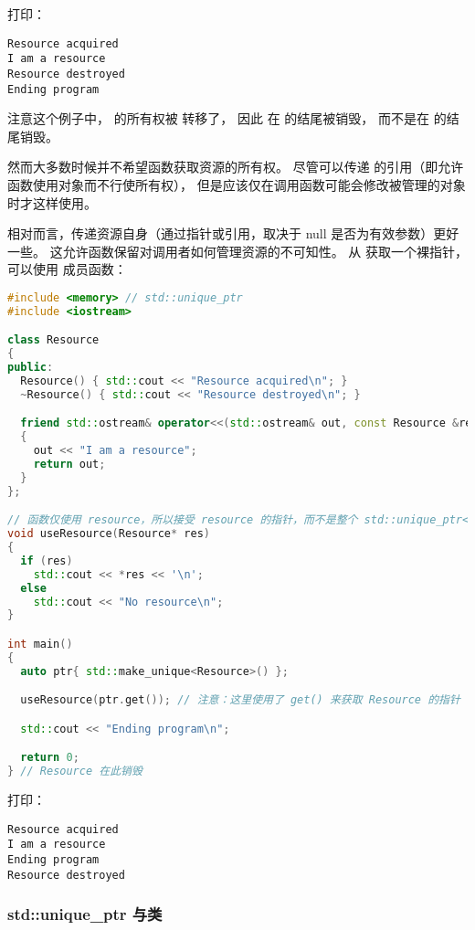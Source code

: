 \documentclass[../../LearnCpp.tex]{subfiles}
\begin{document}
打印：

\begin{lstlisting}
Resource acquired
I am a resource
Resource destroyed
Ending program
\end{lstlisting}

注意这个例子中， 的所有权被  转移了，
因此  在  的结尾被销毁，
而不是在  的结尾销毁。

然而大多数时候并不希望函数获取资源的所有权。
尽管可以传递  的引用（即允许函数使用对象而不行使所有权），
但是应该仅在调用函数可能会修改被管理的对象时才这样使用。

相对而言，传递资源自身（通过指针或引用，取决于 null 是否为有效参数）更好一些。
这允许函数保留对调用者如何管理资源的不可知性。
从  获取一个裸指针，可以使用  成员函数：

\begin{lstlisting}[language=C++]
#include <memory> // std::unique_ptr
#include <iostream>

class Resource
{
public:
  Resource() { std::cout << "Resource acquired\n"; }
  ~Resource() { std::cout << "Resource destroyed\n"; }

  friend std::ostream& operator<<(std::ostream& out, const Resource &res)
  {
    out << "I am a resource";
    return out;
  }
};

// 函数仅使用 resource，所以接受 resource 的指针，而不是整个 std::unique_ptr<Resource> 的引用
void useResource(Resource* res)
{
  if (res)
    std::cout << *res << '\n';
  else
    std::cout << "No resource\n";
}

int main()
{
  auto ptr{ std::make_unique<Resource>() };

  useResource(ptr.get()); // 注意：这里使用了 get() 来获取 Resource 的指针

  std::cout << "Ending program\n";

  return 0;
} // Resource 在此销毁
\end{lstlisting}

打印：

\begin{lstlisting}
Resource acquired
I am a resource
Ending program
Resource destroyed
\end{lstlisting}

\subsubsection*{std::unique\_ptr 与类}
\end{document}
